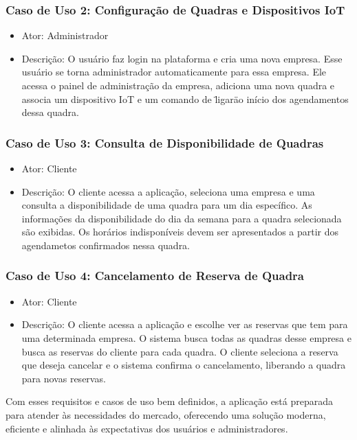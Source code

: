 \subsubsection*{Caso de Uso 2: Configuração de Quadras e Dispositivos IoT}
\begin{itemize}
     \item Ator: Administrador
     \item Descrição: O usuário faz login na plataforma e cria uma nova empresa. Esse usuário se torna administrador automaticamente para essa empresa. Ele acessa o painel de administração da empresa, adiciona uma nova quadra e associa um dispositivo IoT e um comando de \"ligar\" ao início dos agendamentos dessa quadra.
\end{itemize}

\subsubsection*{Caso de Uso 3: Consulta de Disponibilidade de Quadras}
\begin{itemize}
     \item Ator: Cliente
     \item Descrição: O cliente acessa a aplicação, seleciona uma empresa e uma consulta a disponibilidade de uma quadra para um dia específico. As informações da disponibilidade do dia da semana para a quadra selecionada são exibidas. Os horários indisponíveis devem ser apresentados a partir dos agendametos confirmados nessa quadra.
\end{itemize}

\subsubsection*{Caso de Uso 4: Cancelamento de Reserva de Quadra}
\begin{itemize}
     \item Ator: Cliente
     \item Descrição: O cliente acessa a aplicação e escolhe ver as reservas que tem para uma determinada empresa. O sistema busca todas as quadras desse empresa e busca as reservas do cliente para cada quadra. O cliente seleciona a reserva que deseja cancelar e o sistema confirma o cancelamento, liberando a quadra para novas reservas.
\end{itemize}

Com esses requisitos e casos de uso bem definidos, a aplicação está preparada para atender às necessidades do mercado, oferecendo uma solução moderna, eficiente e alinhada às expectativas dos usuários e administradores.
